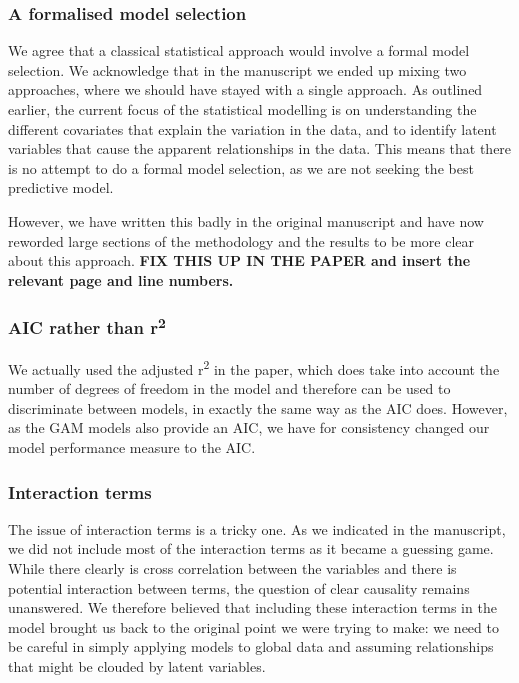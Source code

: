 \documentclass[]{elsarticle} %
\begin{document}
\hypertarget{a-formalised-model-selection}{%
\subsubsection{A formalised model selection}\label{a-formalised-model-selection}}

We agree that a classical statistical approach would involve a formal model selection. We acknowledge that in the manuscript we ended up mixing two approaches, where we should have stayed with a single approach. As outlined earlier, the current focus of the statistical modelling is on understanding the different covariates that explain the variation in the data, and to identify latent variables that cause the apparent relationships in the data. This means that there is no attempt to do a formal model selection, as we are not seeking the best predictive model.

However, we have written this badly in the original manuscript and have now reworded large sections of the methodology and the results to be more clear about this approach. \textbf{FIX THIS UP IN THE PAPER and insert the relevant page and line numbers.}

\hypertarget{aic-rather-than-r2}{%
\subsubsection{\texorpdfstring{AIC rather than r\textsuperscript{2}}{AIC rather than r2}}\label{aic-rather-than-r2}}

We actually used the adjusted r\textsuperscript{2} in the paper, which does take into account the number of degrees of freedom in the model and therefore can be used to discriminate between models, in exactly the same way as the AIC does. However, as the GAM models also provide an AIC, we have for consistency changed our model performance measure to the AIC.

\hypertarget{interaction-terms}{%
\subsubsection{Interaction terms}\label{interaction-terms}}

The issue of interaction terms is a tricky one. As we indicated in the manuscript, we did not include most of the interaction terms as it became a guessing game. While there clearly is cross correlation between the variables and there is potential interaction between terms, the question of clear causality remains unanswered. We therefore believed that including these interaction terms in the model brought us back to the original point we were trying to make: we need to be careful in simply applying models to global data and assuming relationships that might be clouded by latent variables.\\
\end{document}
